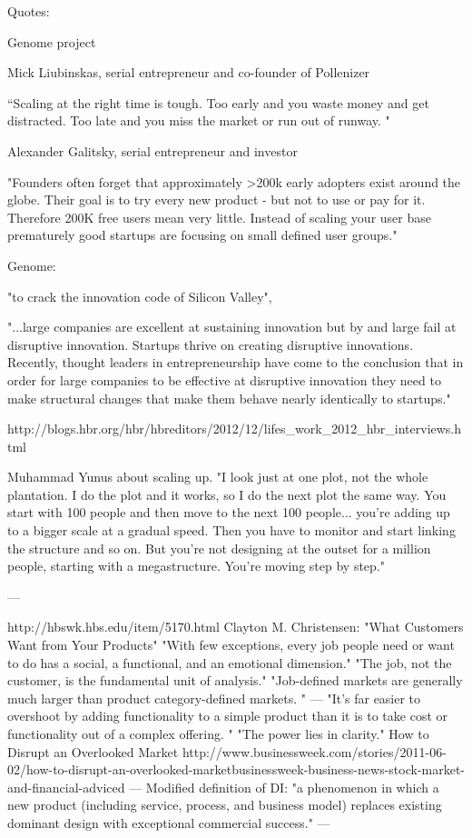 Quotes:

Genome project

Mick Liubinskas, serial entrepreneur and co-founder of Pollenizer

“Scaling at the right time is tough. Too early and you waste money and get
distracted. Too late and you miss the market or run out of runway. "


Alexander Galitsky, serial entrepreneur and investor

"Founders often forget that approximately >200k early adopters exist around the
globe. Their goal is to try every new product - but not to use or pay for it. Therefore
200K free users mean very little. Instead of scaling your user base prematurely
good startups are focusing on small defined user groups."



Genome:

"to crack the innovation code of Silicon Valley", 

"...large companies are excellent at sustaining
innovation but by and large fail at disruptive innovation. Startups thrive on
creating disruptive innovations. Recently, thought leaders in entrepreneurship
have come to the conclusion that in order for large companies to be effective at
disruptive innovation they need to make structural changes that make them
behave nearly identically to startups."


http://blogs.hbr.org/hbr/hbreditors/2012/12/lifes_work_2012_hbr_interviews.html

 Muhammad Yunus about scaling up. "I look just at one plot, not the whole plantation. 
 I do the plot and it works, so I do the next plot the same way.
 You start with 100 people and then move to the next 100 people... 
 you're adding up to a bigger scale at a gradual speed. 
 Then you have to monitor and start linking the structure and so on. 
 But you're not designing at the outset for a million people, starting with a megastructure. 
 You're moving step by step."

---

http://hbswk.hbs.edu/item/5170.html
Clayton M. Christensen: "What Customers Want from Your Products"
"With few exceptions, every job people need or want to do has a social, a functional, and an emotional dimension."
"The job, not the customer, is the fundamental unit of analysis."
"Job-defined markets are generally much larger than product category-defined markets. "
---
"It's far easier to overshoot by adding functionality to a simple product than it is to take cost or functionality out of a complex offering. "
"The power lies in clarity."
How to Disrupt an Overlooked Market
http://www.businessweek.com/stories/2011-06-02/how-to-disrupt-an-overlooked-marketbusinessweek-business-news-stock-market-and-financial-adviced
---
Modified definition of DI:
"a phenomenon in which a new product (including service, process, and business
model) replaces existing dominant design with exceptional commercial success." \cite{managingDisruptiveInnovation}
---


